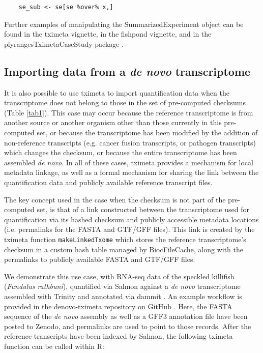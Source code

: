\documentclass[12pt]{article} \usepackage[utf8]{inputenc}
\begin{document}
\begin{verbatim}
    se_sub <- se[se %over% x,]
\end{verbatim}

Further examples of manipulating the SummarizedExperiment object can
be found in the tximeta vignette, in the fishpond vignette, and in the
plyrangesTximetaCaseStudy package \citep{casestudy}.

\subsection*{Importing data from a \textit{de novo} transcriptome}

It is also possible to use tximeta to import quantification data when
the transcriptome does not belong to those in the set of pre-computed
checksums (Table \ref{tab1}). This case may occur because the
reference transcriptome is from another source or another organism
other than those currently in this pre-computed set, or because the
transcriptome has been modified by the addition of non-reference
transcripts (e.g. cancer fusion transcripts, or pathogen transcripts)
which changes the checksum, or because the entire transcriptome has
been assembled \textit{de novo}. In all of these cases, tximeta
provides a mechanism for local metadata linkage, as well as a formal
mechanism for sharing the link between the quantification data and
publicly available reference transcript files.

The key concept used in the case when the checksum is not part of the
pre-computed set, is that of a link constructed between the
transcriptome used for quantification via its hashed checksum and
publicly accessible metadata locations (i.e. permalinks for the FASTA
and GTF/GFF files). This link is created by the tximeta function
\texttt{makeLinkedTxome} which stores the reference transcriptome's
checksum in a custom hash table managed by BiocFileCache, along with
the permalinks to publicly available FASTA and GTF/GFF files.

We demonstrate this use case, with RNA-seq data of the speckled
killifish (\textit{Fundulus rathbuni}), quantified via Salmon
\citep{salmon} against a \textit{de novo} transcriptome assembled with
Trinity \citep{trinity} and annotated via dammit \citep{dammit}. An
example workflow is provided in the denovo-tximeta repository on
GitHub \citep{denovo}. Here, the FASTA sequence of the
\textit{de novo} assembly as well as a GFF3 annotation file have been
posted to Zenodo, and permalinks are used to point to those
records. After the reference transcripts have been indexed by Salmon,
the following tximeta function can be called within R:
\end{document}
